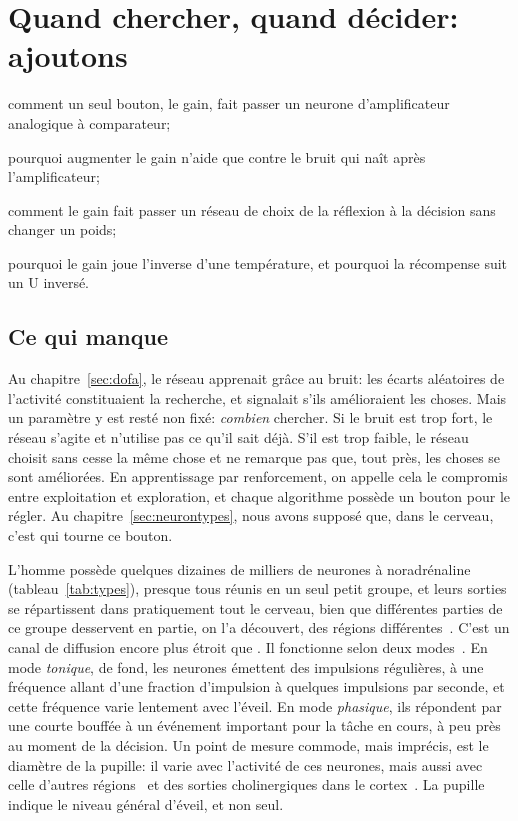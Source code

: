 \chapter{Quand chercher, quand décider: ajoutons }
\label{sec:nora}
\begin{chaptergoals}
\item comment un seul bouton, le gain, fait passer un neurone d'amplificateur analogique à comparateur;
\item pourquoi augmenter le gain n'aide que contre le bruit qui naît après l'amplificateur;
\item comment le gain fait passer un réseau de choix de la réflexion à la décision sans changer un poids;
\item pourquoi le gain joue l'inverse d'une température, et pourquoi la récompense suit un U inversé.
\end{chaptergoals}

\section{Ce qui manque}

Au chapitre~\ref{sec:dofa}, le réseau apprenait grâce au bruit: les écarts aléatoires de l'activité constituaient la recherche, et  signalait s'ils amélioraient les choses. Mais un paramètre y est resté non fixé: \emph{combien} chercher. Si le bruit est trop fort, le réseau s'agite et n'utilise pas ce qu'il sait déjà. S'il est trop faible, le réseau choisit sans cesse la même chose et ne remarque pas que, tout près, les choses se sont améliorées. En apprentissage par renforcement, on appelle cela le compromis entre exploitation et exploration, et chaque algorithme possède un bouton pour le régler. Au chapitre~\ref{sec:neurontypes}, nous avons supposé que, dans le cerveau, c'est  qui tourne ce bouton.

L'homme possède quelques dizaines de milliers de neurones à noradrénaline (tableau~\ref{tab:types}), presque tous réunis en un seul petit groupe, et leurs sorties se répartissent dans pratiquement tout le cerveau, bien que différentes parties de ce groupe desservent en partie, on l'a découvert, des régions différentes~\cite{Poe2020}. C'est un canal de diffusion encore plus étroit que . Il fonctionne selon deux modes~\cite{AstonJones2005}. En mode \emph{tonique}, de fond, les neurones émettent des impulsions régulières, à une fréquence allant d'une fraction d'impulsion à quelques impulsions par seconde, et cette fréquence varie lentement avec l'éveil. En mode \emph{phasique}, ils répondent par une courte bouffée à un événement important pour la tâche en cours, à peu près au moment de la décision. Un point de mesure commode, mais imprécis, est le diamètre de la pupille: il varie avec l'activité de ces neurones, mais aussi avec celle d'autres régions~\cite{Joshi2016} et des sorties cholinergiques dans le cortex~\cite{Reimer2016}. La pupille indique le niveau général d'éveil, et non  seul.

